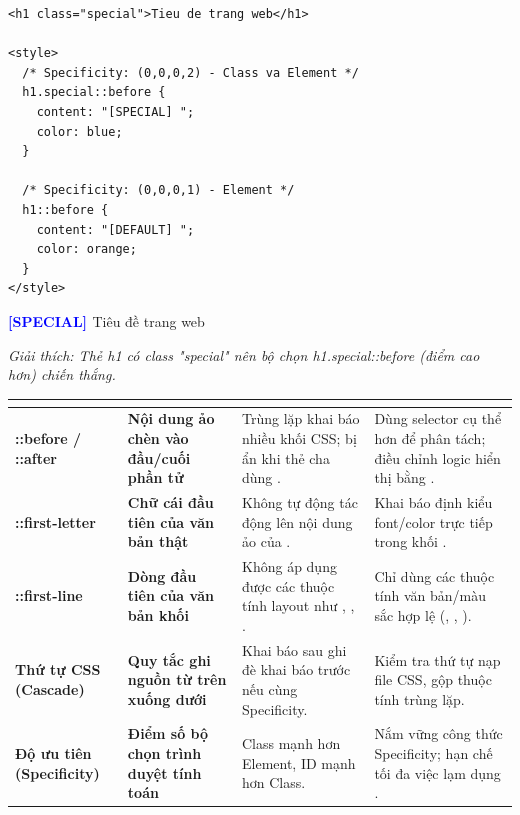 \begin{codeWindow}
\begin{lstlisting}[language=HTML5]
<h1 class="special">Tieu de trang web</h1>

<style>
  /* Specificity: (0,0,0,2) - Class va Element */
  h1.special::before {
    content: "[SPECIAL] ";
    color: blue;
  }

  /* Specificity: (0,0,0,1) - Element */
  h1::before {
    content: "[DEFAULT] ";
    color: orange;
  }
</style>
\end{lstlisting}
\end{codeWindow}

\begin{browserWindow}
\sffamily\small
\textbf{\Large\textcolor{blue}{[SPECIAL] }} Tiêu đề trang web \par\vspace{2pt}
{\scriptsize\textcolor{gray!70}{\textit{Giải thích: Thẻ h1 có class "special" nên bộ chọn h1.special::before (điểm cao hơn) chiến thắng.}}}
\end{browserWindow}

\begin{prettyTableBox}
\sffamily\small
\begin{tabularx}{\linewidth}{|>{\ttfamily\color{accentOrange}\bfseries}m{2.5cm}|>{\bfseries\color{primaryBlue}}m{3.5cm}|Z|Z|}
\hline
{}  &  &  &  \\
\hline
::before / ::after & Nội dung ảo chèn vào đầu/cuối phần tử & Trùng lặp khai báo nhiều khối CSS; bị ẩn khi thẻ cha dùng . & Dùng selector cụ thể hơn để phân tách; điều chỉnh logic hiển thị bằng . \\
\hline
::first-letter & Chữ cái đầu tiên của văn bản thật & Không tự động tác động lên nội dung ảo của . & Khai báo định kiểu font/color trực tiếp trong khối . \\
\hline
::first-line & Dòng đầu tiên của văn bản khối & Không áp dụng được các thuộc tính layout như , , . & Chỉ dùng các thuộc tính văn bản/màu sắc hợp lệ (, , ). \\
\hline
Thứ tự CSS (Cascade) & Quy tắc ghi nguồn từ trên xuống dưới & Khai báo sau ghi đè khai báo trước nếu cùng Specificity. & Kiểm tra thứ tự nạp file CSS, gộp thuộc tính trùng lặp. \\
\hline
Độ ưu tiên (Specificity) & Điểm số bộ chọn trình duyệt tính toán & Class mạnh hơn Element, ID mạnh hơn Class. & Nắm vững công thức Specificity; hạn chế tối đa việc lạm dụng . \\
\hline
\end{tabularx}
\end{prettyTableBox}

